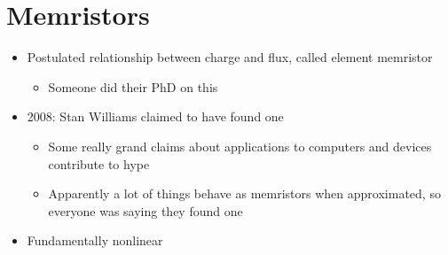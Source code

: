 \documentclass{report}
\begin{document}
\section{Memristors}

\begin{itemize}
    \item Postulated relationship between charge and flux, called element memristor
    \begin{itemize}
        \item Someone did their PhD on this
    \end{itemize}
    \item 2008: Stan Williams claimed to have found one
    \begin{itemize}
        \item Some really grand claims about applications to computers and devices contribute to hype
        \item Apparently a lot of things behave as memristors when approximated, so everyone was saying they found one
    \end{itemize}
    \item Fundamentally nonlinear
\end{itemize}
\end{document}
